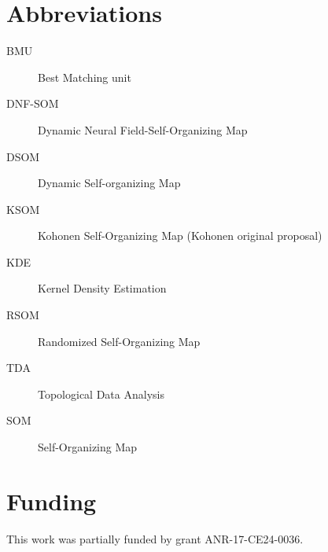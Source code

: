 \documentclass[a4paper, 11pt]{article}
\begin{document}
\maketitle

\setcounter{tocdepth}{2}
\tableofcontents
\pagebreak





\section*{Abbreviations}
\begin{description}
    \item[BMU]     Best Matching unit
    \item[DNF-SOM] Dynamic Neural Field-Self-Organizing Map
    \item[DSOM]    Dynamic Self-organizing Map
    \item[KSOM]    Kohonen Self-Organizing Map (Kohonen original proposal)
    \item[KDE]     Kernel Density Estimation
    \item[RSOM]    Randomized Self-Organizing Map
    \item[TDA]     Topological Data Analysis
    \item[SOM]     Self-Organizing Map
\end{description}

\section*{Funding}
This work was partially funded by grant ANR-17-CE24-0036.




\newpage
\appendix

\end{document}
